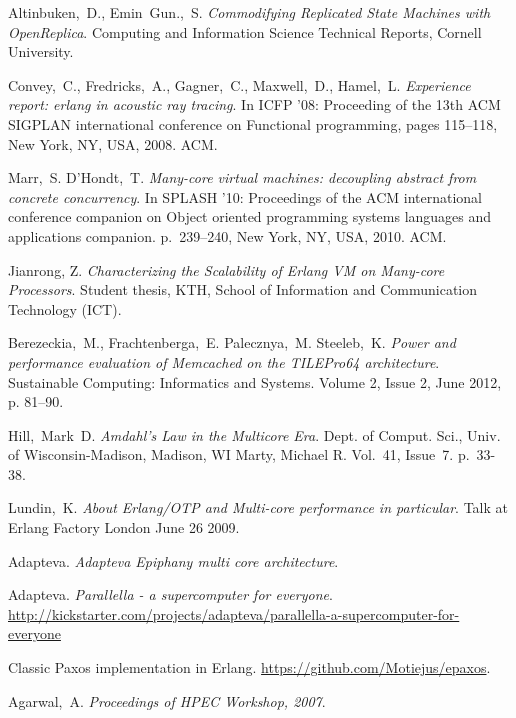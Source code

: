 \documentclass[english,11pt]{l4proj}
\begin{document}
\begin{thebibliography}{99}
     Altinbuken,~D., Emin~Gun.,~S. \emph{Commodifying
        Replicated State Machines with OpenReplica}. Computing and
        Information Science Technical Reports, Cornell University.

     Convey,~C., Fredricks,~A., Gagner,~C.,
        Maxwell,~D., Hamel,~L. \emph{Experience report: erlang in acoustic ray
        tracing}. In ICFP ’08: Proceeding of the 13th ACM SIGPLAN international
        conference on Functional programming, pages 115–118, New York, NY, USA,
        2008. ACM.

     Marr,~S. D’Hondt,~T. \emph{Many-core virtual machines:
        decoupling abstract from concrete concurrency}. In SPLASH ’10:
        Proceedings of the ACM international conference companion on Object
        oriented programming systems languages and applications companion.
        p.~239–240, New York, NY, USA, 2010. ACM.

     Jianrong, Z. \emph{Characterizing the
        Scalability of Erlang VM on Many-core Processors}. Student thesis, KTH,
        School of Information and Communication Technology (ICT).

     Berezeckia,~M., Frachtenberga,~E. Palecznya,~M.
        Steeleb,~K. \emph{Power and performance evaluation of Memcached on the
        TILEPro64 architecture}. Sustainable Computing: Informatics and Systems.
        Volume 2, Issue 2, June 2012, p. 81–90.

     Hill,~Mark~D. \emph{Amdahl's Law in the Multicore
        Era}. Dept. of Comput. Sci., Univ. of Wisconsin-Madison, Madison, WI
        Marty, Michael R.  Vol.~41, Issue~7. p.~33-38.

     Lundin,~K. \emph{About Erlang/OTP and Multi-core
        performance in particular}. Talk at Erlang Factory London June 26 2009.

     Adapteva. \emph{Adapteva Epiphany multi core
    architecture}.

     Adapteva. \emph{Parallella - a
    supercomputer for everyone}. {\small \url{
http://kickstarter.com/projects/adapteva/parallella-a-supercomputer-for-everyone
}}

     Classic Paxos implementation in Erlang. {\small \url{
    https://github.com/Motiejus/epaxos}}.

     Agarwal,~A. \emph{Proceedings of HPEC Workshop,
    2007}.


\end{thebibliography}
\end{document}
